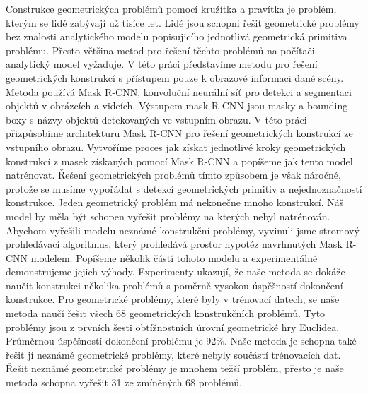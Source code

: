 \documentclass[12pt]{report}
\begin{document}

Construkce geometrických problémů pomocí kružítka a pravítka je problém, kterým se lidé zabývají už tisíce let. Lidé jsou schopni řešit geometrické problémy bez znalosti analytického modelu popisujicího jednotlivá geometrická primitiva problému. Přesto většina metod pro řešení těchto problémů na počítači analytický model vyžaduje. V této práci představíme metodu pro řešení geometrických konstrukcí s přístupem pouze k obrazové informaci dané scény.
Metoda používá Mask {R-CNN}, konvoluční neurální síť pro detekci a segmentaci objektů v obrázcích a videích. Výstupem mask {R-CNN} jsou masky a bounding boxy s názvy objektů detekovaných ve vstupním obrazu. V této práci přizpůsobíme architekturu Mask R-CNN pro řešení geometrických konstrukcí ze vstupního obrazu. Vytvoříme proces jak získat jednotlivé kroky geometrických konstrukcí z masek získaných pomocí Mask R-CNN a popíšeme jak tento model natrénovat. Řešení geometrických problémů tímto způsobem je však náročné, protože se musíme vypořádat s detekcí geometrických primitiv a nejednoznačností konstrukce. Jeden geometrický problém má nekonečne mnoho konstrukcí. Náš model by měla být schopen vyřešit problémy na kterých nebyl natrénován. Abychom vyřešili modelu neznámé konstrukční problémy, vyvinuli jsme stromový prohledávací algoritmus, který prohledává prostor hypotéz navrhnutých Mask {R-CNN} modelem. Popíšeme několik částí tohoto modelu a experimentálně demonstrujeme jejich výhody. Experimenty ukazují, že naše metoda se dokáže naučit konstrukci několika problémů s poměrně vysokou úspěšností dokončení konstrukce. Pro geometrické problémy, které byly v trénovací datech, se naše metoda naučí řešit všech 68 geometrických konstrukčních problémů. Tyto problémy jsou z prvních šesti obtížnostních úrovní geometrické hry Euclidea. Průměrnou úspěšností dokončení problému je 92\%. Naše metoda je schopna také řešit jí neznámé geometrické problémy, které nebyly součástí trénovacích dat. Řešit neznámé geometrické problémy je mnohem težší problém, přesto je naše metoda schopna vyřešit 31 ze zmíněných 68 problémů.
\end{document}
